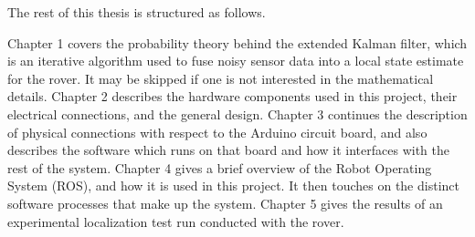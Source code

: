 The rest of this thesis is structured as follows.

Chapter 1 covers the probability theory behind the extended Kalman filter, which is an iterative algorithm used to fuse noisy sensor data into a local state estimate for the rover. It may be skipped if one is not interested in the mathematical details. Chapter 2 describes the hardware components used in this project, their electrical connections, and the general design. Chapter 3 continues the description of physical connections with respect to the Arduino circuit board, and also describes the software which runs on that board and how it interfaces with the rest of the system. Chapter 4 gives a brief overview of the Robot Operating System (ROS), and how it is used in this project. It then touches on the distinct software processes that make up the system. Chapter 5 gives the results of an experimental localization test run conducted with the rover.

